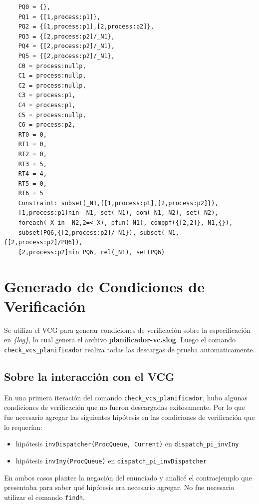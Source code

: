 \documentclass{article}
\begin{document}
\begin{verbatim}
    PQ0 = {},  
    PQ1 = {[1,process:p1]},  
    PQ2 = {[1,process:p1],[2,process:p2]},  
    PQ3 = {[2,process:p2]/_N1},  
    PQ4 = {[2,process:p2]/_N1},  
    PQ5 = {[2,process:p2]/_N1},  
    C0 = process:nullp,  
    C1 = process:nullp,  
    C2 = process:nullp,  
    C3 = process:p1,  
    C4 = process:p1,  
    C5 = process:nullp,  
    C6 = process:p2,  
    RT0 = 0,  
    RT1 = 0,  
    RT2 = 0,  
    RT3 = 5,  
    RT4 = 4,  
    RT5 = 0,  
    RT6 = 5
    Constraint: subset(_N1,{[1,process:p1],[2,process:p2]}), 
    [1,process:p1]nin _N1, set(_N1), dom(_N1,_N2), set(_N2), 
    foreach(_X in _N2,2=<_X), pfun(_N1), comppf({[2,2]},_N1,{}), 
    subset(PQ6,{[2,process:p2]/_N1}), subset(_N1,{[2,process:p2]/PQ6}), 
    [2,process:p2]nin PQ6, rel(_N1), set(PQ6)
\end{verbatim}


\section{Generado de Condiciones de Verificación}

Se utiliza el VCG para generar condiciones de verificación sobre la especificación en \textit{\{log\}}, lo cual genera el archivo \textbf{planificador-vc.slog}. Luego el comando \verb|check_vcs_planificador| realiza todas las descargas de prueba automaticamente.

\subsection*{Sobre la interacción con el VCG}

En una primera iteración del comando \verb|check_vcs_planificador|, hubo algunas condiciones de verificación que no fueron descargadas exitosamente. Por lo que fue necesario agregar las siguientes hipótesis en las condiciones de verificación que lo requerían:

\begin{itemize}
    \item hipótesis \verb|invDispatcher(ProcQueue, Current)| en \verb|dispatch_pi_invIny|
    \item hipótesis \verb|invIny(ProcQueue)| en \verb|dispatch_pi_invDispatcher|
\end{itemize}

En ambos casos plantee la negación del enunciado y analicé el contraejemplo que presentaba para saber qué hipótesis era necesario agregar. No fue necesario utilizar el comando \verb|findh|.
\end{document}
